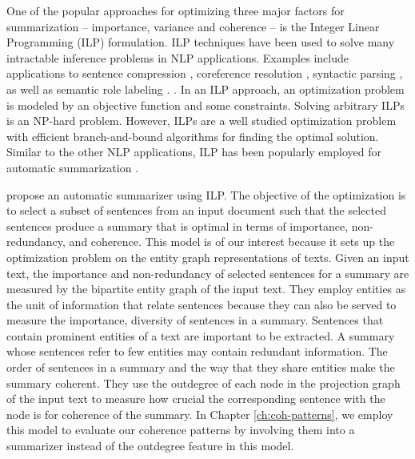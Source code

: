 One of the popular approaches for optimizing three major factors for summarization -- importance, variance and coherence -- is the Integer Linear Programming (ILP) formulation. 
ILP techniques have been used to solve many intractable inference problems in NLP applications. 
Examples include applications to sentence compression \cite{clarke10,filippova13}, coreference resolution \cite{denis09},  syntactic parsing \cite{klenner07a}, as well as semantic role labeling \cite{punyakanok04b}.
\cite{marciniak05b,mcdonald07,bergkirkpatrick11,woodsend12,lichen13a,hirao13}.
In an ILP approach, an optimization problem is modeled by an objective function and some constraints. 
Solving arbitrary ILPs is an \mbox{NP-hard} problem. 
However, ILPs are a well studied optimization problem with efficient \mbox{branch-and-bound} algorithms for finding the optimal solution. 
Similar to the other NLP applications, ILP has been popularly employed for automatic summarization 
\cite{marciniak05b,mcdonald07,bergkirkpatrick11,woodsend12,lichen13a,hirao13}.  

 propose an automatic summarizer using ILP.  
The objective of the optimization is to select a subset of sentences from an input document such that the selected sentences produce a summary that is optimal in terms of importance, non-redundancy, and coherence. 
This model is of our interest because it sets up the optimization problem on the entity graph representations of texts. 
Given an input text, the importance and non-redundancy of selected sentences for a summary are measured by the bipartite entity graph of the input text. 
They employ entities as the unit of information that relate sentences because they can also be served to measure the importance, diversity of sentences in a summary. 
Sentences that contain prominent entities of a text are important to be extracted. 
A summary whose sentences refer to few entities may contain redundant information. 
The order of sentences in a summary and the way that they share entities make the summary coherent. 
They use the outdegree of each node in the projection graph of the input text to measure how crucial the corresponding sentence with the node is for coherence of the summary.  
In Chapter \ref{ch:coh-patterns}, we employ this model to evaluate our coherence patterns by involving them into a summarizer instead of the outdegree feature in this model. 



